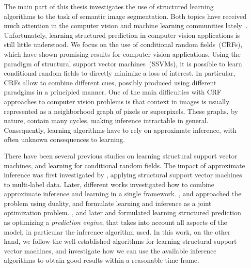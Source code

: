 The main part of this thesis investigates the use of structured learning~\citep{taskar2003max, tsochantaridis2006large}
algorithms to the task of semantic image segmentation. Both topics have received
much attention in the computer vision and machine learning communities
lately~\citep{ladicky2009associative, krahenbuhl2012efficient,
branson2013efficient, blake2011markov}.
Unfortunately, learning structured prediction in computer vision applications
is still little understood.
We focus on the use of conditional random fields~(CRFs), which have shown
promising  results for computer vision applications. Using the paradigm of structural
support vector machines~(SSVMs), it is possible to learn conditional random fields to
directly minimize a loss of interest. In particular, CRFs
allow to combine different cues, possibly produced using different paradgims in a
principled manner. One of the main difficulties with CRF approaches to computer
vision problems is that context in images is usually represented as a
neighborhood graph of pizels or superpixels.  These graphs, by nature, contain many cycles, making
inference intractable in general. Consequently, learning algorithms have to
rely on approximate inference, with often unknown consequences to learning.

There have been several previous studies on learning structural support vector
machines, and learning for conditional random fields. The impact of approximate
inference was first investigated by \citet{finley2008training}, applying
structural support vector machines to multi-label data. Later, different works
investigated how to combine approximate inference and learning in a single
framework. \citet{meshi2010learning, komodakis2011efficient}, and
\citet{hazan2010primal} approached the problem using duality, and formulate
learning and inference as a joint optimization problem.
\citet{stoyanov2011empirical}, and later \citet{jancsarylearning} and
\citet{krahenbuhlparameter} formulated learning structured prediction as
optimizing a \emph{prediction engine}, that takes into account all aspects of
the model, in particular the inference algorithm used.
In this work, on the other hand, we follow the well-established algorithms for
learning structural support vector machines, and investigate how we can use the
available inference algorithms to obtain good results within a reasonable
time-frame.


